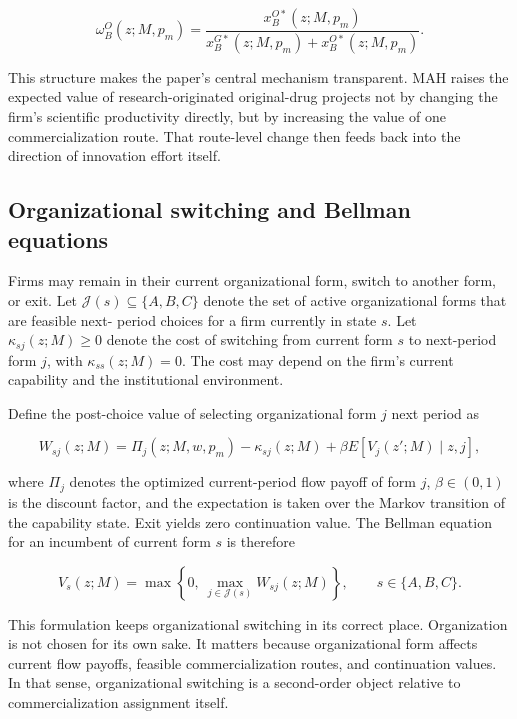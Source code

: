 \documentclass[12pt]{article}
\begin{document}
\begin{equation}
\omega_B^O(z;M,p_m)=\frac{x_B^{O*}(z;M,p_m)}{x_B^{G*}(z;M,p_m)+x_B^{O*}(z;M,p_m)}.
\end{equation}

This structure makes the paper's central mechanism transparent. MAH raises the expected
value of research-originated original-drug projects not by changing the firm's scientific
productivity directly, but by increasing the value of one commercialization route. That
route-level change then feeds back into the direction of innovation effort itself.
\subsection{Organizational switching and Bellman equations}

Firms may remain in their current organizational form, switch to another form, or exit. Let
$\mathcal{J}(s)\subseteq\{A,B,C\}$ denote the set of active organizational forms that are feasible next-
period choices for a firm currently in state $s$. Let $\kappa_{sj}(z;M)\ge 0$ denote the cost of switching from
current form $s$ to next-period form $j$, with $\kappa_{ss}(z;M)=0$. The cost may depend on the firm's current capability and the institutional environment.

Define the post-choice value of selecting organizational form $j$ next period as

\begin{equation}
W_{sj}(z;M)=\Pi_j(z;M,w,p_m)-\kappa_{sj}(z;M)+\beta E\!\left[V_j(z';M)\mid z,j\right],
\end{equation}

where $\Pi_j$ denotes the optimized current-period flow payoff of form $j$, $\beta\in(0,1)$ is the discount
factor, and the expectation is taken over the Markov transition of the capability state. Exit
yields zero continuation value. The Bellman equation for an incumbent of current form $s$ is
therefore

\begin{equation}
V_s(z;M)=\max\left\{0,\ \max_{j\in\mathcal{J}(s)} W_{sj}(z;M)\right\},
\qquad s\in\{A,B,C\}.
\end{equation}

This formulation keeps organizational switching in its correct place. Organization is not
chosen for its own sake. It matters because organizational form affects current flow payoffs,
feasible commercialization routes, and continuation values. In that sense, organizational
switching is a second-order object relative to commercialization assignment itself.
\end{document}
